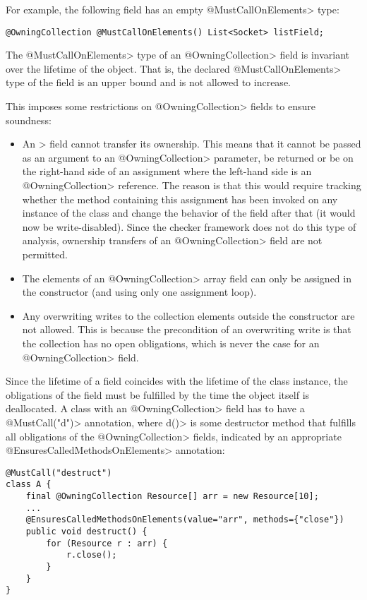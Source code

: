 For example, the following field has an empty \<@MustCallOnElements> type:

\begin{verbatim}
@OwningCollection @MustCallOnElements() List<Socket> listField;
\end{verbatim}

The \<@MustCallOnElements> type of an \<@OwningCollection> field is invariant over the lifetime of the object. That is, the declared \<@MustCallOnElements> type of the field is an upper bound and is not allowed to increase.

This imposes some restrictions on \<@OwningCollection> fields to ensure soundness:

\begin{itemize}
  \item An \@OwningCollection> field cannot transfer its ownership. This means that it cannot be passed as an argument to an \<@OwningCollection> parameter, be returned or be on the right-hand side of an assignment where the left-hand side is an \<@OwningCollection> reference. The reason is that this would require tracking whether the method containing this assignment has been invoked on any instance of the class and change the behavior of the field after that (it would now be write-disabled). Since the checker framework does not do this type of analysis, ownership transfers of an \<@OwningCollection> field are not permitted.
  \item The elements of an \<@OwningCollection> array field can only be assigned in the constructor (and using only one assignment loop).
  \item Any overwriting writes to the collection elements outside the constructor are not allowed. This is because the precondition of an overwriting write is that the collection has no open obligations, which is never the case for an \<@OwningCollection> field.
\end{itemize}

Since the lifetime of a field coincides with the lifetime of the class instance, the obligations of the field must be fulfilled by the time the object itself is deallocated.
A class with an \<@OwningCollection> field has to have a \<@MustCall("d")> annotation, where \<d()> is some destructor method that fulfills all obligations of the \<@OwningCollection> fields, indicated by an appropriate \<@EnsuresCalledMethodsOnElements> annotation:

\begin{verbatim}
@MustCall("destruct")
class A {
    final @OwningCollection Resource[] arr = new Resource[10];
    ...
    @EnsuresCalledMethodsOnElements(value="arr", methods={"close"})
    public void destruct() {
        for (Resource r : arr) {
            r.close();
        }
    }
}
\end{verbatim}

